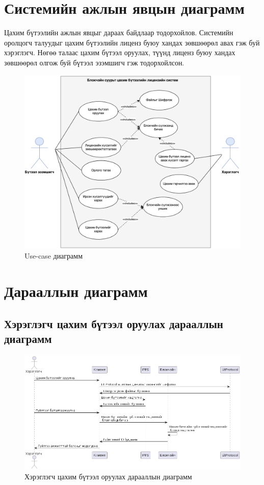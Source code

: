 \newpage
\section{Системийн ажлын явцын диаграмм}
Цахим бүтээлийн ажлын явцыг дараах байдлаар тодорхойлов. Системийн оролцогч талуудыг цахим бүтээлийн лиценз буюу хандах зөвшөөрөл авах гэж буй хэрэглэгч. Нөгөө талаас цахим бүтээл оруулах, түүнд лиценз буюу хандах зөвшөөрөл олгож буй бүтээл эзэмшигч гэж тодорхойлсон.
\begin{figure}[h!]
	\centering
	\includegraphics[scale=0.36]{src/images/usecase.png}
	\caption{Use-case диаграмм}
\end{figure}

\pagebreak
\section{Дарааллын диаграмм}
\subsection{Хэрэглэгч цахим бүтээл оруулах дарааллын диаграмм}
\begin{figure}[h!]
	\centering
	\includegraphics[scale=0.54, angle=90]{src/images/sequence.png}
	\caption{Хэрэглэгч цахим бүтээл оруулах дарааллын диаграмм}
\end{figure}

